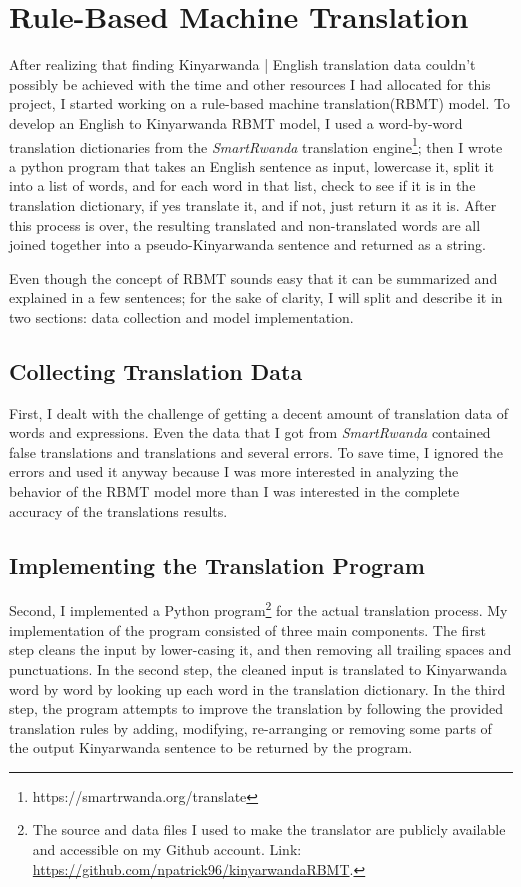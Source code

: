 \chapter{Rule-Based Machine Translation} %
After realizing that finding Kinyarwanda | English translation data couldn't possibly be achieved with the time and other resources I had allocated for this project, I started working on a rule-based machine translation(RBMT) model. To develop an English to Kinyarwanda RBMT model, I used a word-by-word translation dictionaries from the \textit{SmartRwanda} translation engine\footnote{https://smartrwanda.org/translate}; then I wrote a python program that takes an English sentence as input, lowercase it, split it into a list of words, and for each word in that list, check to see if it is in the translation dictionary, if yes translate it, and if not, just return it as it is. After this process is over, the resulting translated and non-translated words are all joined together into a pseudo-Kinyarwanda sentence and returned as a string.

Even though the concept of RBMT sounds easy that it can be summarized and explained in a few sentences; for the sake of clarity, I will split and describe it in two sections: data collection and model implementation. 
\section{Collecting Translation Data}
First, I dealt with the challenge of getting a decent amount of translation data of words and expressions. Even the data that I got from \textit{SmartRwanda} contained false translations and translations and several errors. To save time, I ignored the errors and used it anyway because I was more interested in analyzing the behavior of the RBMT model more than I was interested in the complete accuracy of the translations results.
\section{Implementing the Translation Program}
Second, I implemented a Python program\footnote{The source and data files I used to make the translator are publicly available and accessible on my Github account. Link: \url{https://github.com/npatrick96/kinyarwandaRBMT}.} for the actual translation process. My implementation of the program consisted of three main components. The ﬁrst step cleans the input by lower-casing it, and then removing all trailing spaces and punctuations. In the second step, the cleaned input is translated to Kinyarwanda word by word by looking up each word in the translation dictionary. In the third step, the program attempts to improve the translation by following the provided translation rules by adding, modifying, re-arranging or removing some parts of the output Kinyarwanda sentence to be returned by the program.

